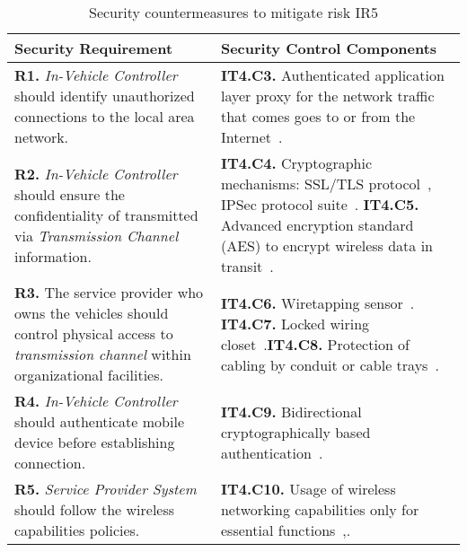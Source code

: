 \documentclass[manuscript]{acmart}
\begin{document}
\begin{table}[htbp]
\caption{Security countermeasures to mitigate risk IR5}
\begin{center}
\begin{tabular}{|p{6.5cm}|p{7.5cm}|}
\hline
\bf\scriptsize{Security Requirement} &\bf \scriptsize{Security Control Components}\\
\hline
	\scriptsize{\textbf{R1.} \textit{In-Vehicle Controller} should identify unauthorized connections to the local area network.} & \scriptsize{\textbf{IT4.C3.} Authenticated application layer proxy for the network traffic that comes goes to or from the Internet~\cite{CISControls}.} \\ \hline
	
	\scriptsize{\textbf{R2.} \textit{In-Vehicle Controller} should ensure the confidentiality of transmitted via \textit{Transmission Channel} information.} & \scriptsize{\textbf{IT4.C4.} Cryptographic mechanisms: SSL/TLS protocol~\cite{CISControls}, IPSec protocol suite~\cite{NistSP800_53}.} \scriptsize{\textbf{IT4.C5.} Advanced encryption standard (AES) to encrypt wireless data in transit~\cite{CISControls}.} \\ \hline
	
    \scriptsize{\textbf{R3.} The service provider who owns the vehicles should control physical access to \textit{transmission channel} within organizational facilities.} & \scriptsize{\textbf{IT4.C6.} Wiretapping sensor~\cite{NistSP800_53}.} \scriptsize{\textbf{IT4.C7.} Locked wiring closet~\cite{NistSP800_53}.}\scriptsize{\textbf{IT4.C8.} Protection of cabling by conduit or cable trays~\cite{NistSP800_53}.}\\ \hline
	
	\scriptsize{\textbf{R4.} \textit{In-Vehicle Controller} should authenticate mobile device before establishing connection.} & \scriptsize{\textbf{IT4.C9.} Bidirectional cryptographically based authentication~\cite{NistSP800_53}.} \\ \hline
	
	\scriptsize{\textbf{R5.} \textit{Service Provider System} should follow the wireless capabilities policies.} &\scriptsize{\textbf{IT4.C10.} Usage of wireless networking capabilities only for essential functions~\cite{CISControls},\cite{NistSP800_53}.}\label{tab:ReqsCaseAnalysis}\\\hline
\end{tabular}
\end{center}
\end{table}
\end{document}

